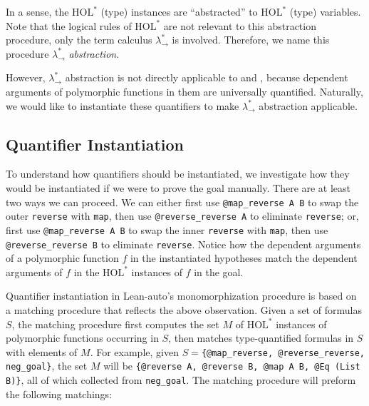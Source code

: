In a sense, the $\text{HOL}^*$ (type) instances are ``abstracted'' to $\text{HOL}^*$ (type)
variables. Note that the logical rules of $\text{HOL}^*$ are not relevant to this abstraction procedure, only
the term calculus $\lambda_\to^*$ is involved. Therefore, we name this procedure $\lambda_\to^*$ \textit{abstraction}.

However, $\lambda_\to^*$ abstraction is not directly applicable to \usebox{\vmaprev} and
\usebox{\vrevrev}, because dependent arguments of polymorphic functions in them are universally
quantified. Naturally, we would like to instantiate these quantifiers to make $\lambda_\to^*$
abstraction applicable.

\subsection{Quantifier Instantiation} \label{exinst}

To understand how quantifiers should be instantiated, we investigate how they would
be instantiated if we were to prove the goal manually. There are at least two ways we can proceed. We can
either first use \texttt{@map\_reverse A B} to swap the outer \texttt{reverse} with \texttt{map}, then
use \texttt{@reverse\_reverse A} to eliminate \texttt{reverse}; or, first use
\texttt{@map\_reverse A B} to swap the inner \texttt{reverse} with \texttt{map}, then
use \texttt{@reverse\_reverse B} to eliminate \texttt{reverse}. Notice how the dependent
arguments of a polymorphic function $f$ in the instantiated hypotheses match the dependent
arguments of $f$ in the $\text{HOL}^*$ instances of $f$ in the goal.

Quantifier instantiation in Lean-auto's monomorphization procedure is based
on a matching procedure that reflects the above observation. Given a set of formulas $S$,
the matching procedure first computes the set $M$ of $\text{HOL}^*$ instances of polymorphic functions occurring
in $S$, then matches type-quantified formulas in $S$ with elements of $M$. For example,
given $S=$\texttt{\{@map\_reverse, @reverse\_reverse, neg\_goal\}}, the set $M$ will be
\texttt{\{@reverse A, @reverse B, @map A B, @Eq (List B)\}}, all of which collected from \texttt{neg\_goal}.
The matching procedure will preform the following matchings:

